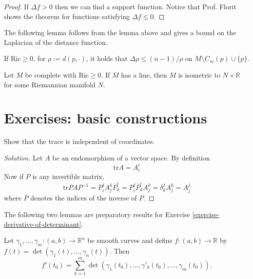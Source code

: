 \begin{proof}
If $\Delta f>0$ then we can find a support function. Notice that Prof. Florit
shows the theorem for functions satisfying $\Delta f \leq 0$.
\end{proof}

The following lemma follows from the lemma above and gives a bound on the
Laplacian of the distance function.

\begin{lemma}[Calabi]
\label{lemma-Calabi}
If $\text{Ric} \geq 0$, for $\rho:=d(p,\cdot)$, it holds that 
$\Delta\rho \leq (n-1)/\rho$ on $M\setminus C_m(p)\cup\{p\}$.
\end{lemma}


\begin{theorem}
\label{theorem-splitting}
Let $M$ be complete with  $\text{Ric}\geq0$. If $M$ has a line, then $M$ is
isometric to $N\times\mathbb{R}$ for some Riemannian manifold $N$.
\end{theorem}

\section{Exercises: basic constructions}
\label{section-exercises-constructions}

\begin{exercise}
\label{exercise-trace-is-independent-of-coordinates}
Show that the trace is independent of coordinates.
\end{exercise}

\begin{proof}[Solution]
Let $A$ be an endomorphism of a vector space. By definition
$$
\text{tr}A=A_i^i
$$
Now if $P$ is any invertible matrix,
$$
\text{tr}PAP^{-1}=P^j_iA_j^k\overline{P}_k^i=P^j_i\overline{P}_k^iA_j^k
=\delta_k^jA_j^k=A_j^j
$$
where $\overline{P}$ denotes the indices of the inverse of $P$.
\end{proof}

The following two lemmas are preparatory results for Exercise
\ref{exercise-derivative-of-determinant}.

\begin{lemma}
\label{lemma-for-derivative-of-determinant1}
Let $\gamma_1,...,\gamma_m:(a,b)\to\mathbb{R}^n$ be smooth curves and define 
$f:(a,b)\to\mathbb{R}$ by $f(t)=\det(\gamma_1(t),\ldots,\gamma_n(t))$. Then
$$
f'(t_0)
=\sum_{k=1}^{m}\det(\gamma_1(t_0),\ldots,\gamma'_k(t_0),\ldots,\gamma_m(t_0)).
$$
\end{lemma}


